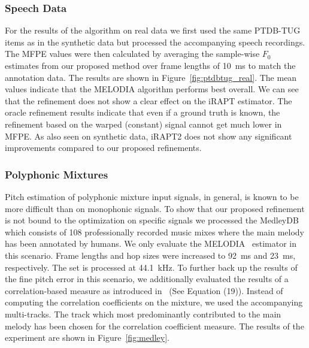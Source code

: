\vspace{-0.6em}
\subsubsection{Speech Data} %
\label{ssub:speech}
For the results of the algorithm on real data we first used the same PTDB-TUG items as in the synthetic data but processed the accompanying speech recordings. The MFPE values were then calculated by averaging the sample-wise $F_0$ estimates from our proposed method over frame lengths of \SI{10}{\milli\second} to match the annotation data. The results are shown in Figure~\ref{fig:ptdbtug_real}. The mean values indicate that the MELODIA algorithm performs best overall. We can see that the refinement does not show a clear effect on the iRAPT estimator. The oracle refinement results indicate that even if a ground truth is known, the refinement based on the warped (constant) signal cannot get much lower in MFPE. As also seen on synthetic data, iRAPT2 does not show any significant improvements compared to our proposed refinements.

\vspace{-0.6em}
\subsubsection{Polyphonic Mixtures} %
\label{ssub:polyphonic}

Pitch estimation of polyphonic mixture input signals, in general, is known to be more difficult than on monophonic signals. To show that our proposed refinement is not bound to the optimization on specific signals we processed the \mbox{MedleyDB}~\cite{MedleyDB} which consists of 108 professionally recorded music mixes where the main melody has been annotated by humans. We only evaluate the MELODIA~\cite{salamon14} estimator in this scenario. Frame lengths and hop sizes were increased to \SI{92}{\milli\second} and \SI{23}{{\milli\second}}, respectively. The set is processed at 44.1~kHz. To further back up the results of the fine pitch error in this scenario, we additionally evaluated the results of a correlation-based measure as introduced in~\cite{resch07} (See Equation (19)). Instead of computing the correlation coefficients on the mixture, we used the accompanying multi-tracks. The track which most predominantly contributed to the main melody has been chosen for the correlation coefficient measure. The results of the experiment are shown in Figure~\ref{fig:medley}.

